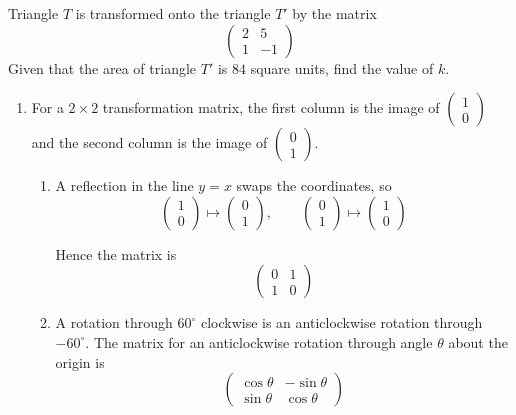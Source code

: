 \documentclass[leqno]{article}
\begin{document}
\begin{enumerate}[
  label=\textbf{\arabic*.},
  leftmargin=*,
  topsep=0pt,
  partopsep=0pt,
  parsep=0pt
]
\begin{enumerate}[label=\textbf{(\roman*)}]
  Triangle $T$ is transformed onto the triangle $T'$ by the matrix
  \[
  \begin{pmatrix}
  2 & 5 \\
  1 & -1
  \end{pmatrix}
  \]
  Given that the area of triangle $T'$ is $84$ square units, find the value of $k$.  \\
\end{enumerate}

\vspace*{10pt}

\begin{djsSolution}
\begin{enumerate}[label=\textbf{(\roman*)}]
  \item For a $2\times 2$ transformation matrix, the first column is the image of $\begin{pmatrix}1\\0\end{pmatrix}$ and the second column is the image of $\begin{pmatrix}0\\1\end{pmatrix}$.
  
  \begin{enumerate}[label=(\alph*)]
    \item A reflection in the line $y=x$ swaps the coordinates, so
    \[
    \begin{pmatrix}1\\0\end{pmatrix}\mapsto \begin{pmatrix}0\\1\end{pmatrix},
    \qquad
    \begin{pmatrix}0\\1\end{pmatrix}\mapsto \begin{pmatrix}1\\0\end{pmatrix}
    \]

    Hence the matrix is
    \[
    \begin{pmatrix}
    0 & 1\\
    1 & 0
    \end{pmatrix}
    \]

    \item A rotation through $60^\circ$ clockwise is an anticlockwise rotation through $-60^\circ$. The matrix for an anticlockwise rotation through angle $\theta$ about the origin is
    \[
    \begin{pmatrix}
    \cos\theta & -\sin\theta\\
    \sin\theta & \cos\theta
    \end{pmatrix}
    \]


\end{enumerate}
\end{enumerate}
\end{djsSolution}
\end{enumerate}
\end{document}
